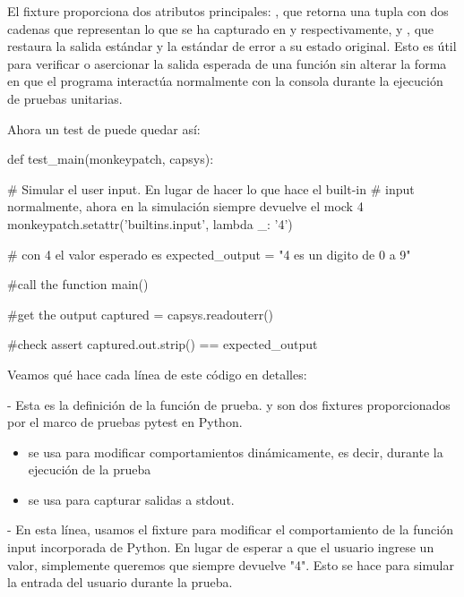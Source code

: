 El fixture  proporciona dos atributos principales: 
 , 
que retorna una tupla con dos cadenas que representan lo que se ha capturado en  y  respectivamente,
y ,
que restaura la salida estándar y la estándar de error a su estado original. Esto es útil para verificar o asercionar la salida esperada de una función sin alterar la forma en que el programa interactúa normalmente con la consola durante la ejecución de pruebas unitarias.

Ahora un test de  puede quedar así:

\begin{python}
def test_main(monkeypatch, capsys): 

    # Simular el user input. En lugar de hacer lo que hace el built-in
    # input normalmente, ahora en la simulación siempre devuelve el mock 4
    monkeypatch.setattr('builtins.input', lambda _: '4')
    
    # con 4 el valor esperado es
    expected_output = "4 es un digito de 0 a 9"
    
    #call the function
    main()
    
    #get the output
    captured = capsys.readouterr()
    
    #check
    assert captured.out.strip() == expected_output
\end{python}

Veamos qué hace cada línea de este código en detalles:

 - Esta es la definición de la función de prueba.  y  son dos fixtures proporcionados por el marco de pruebas pytest en Python. 

\begin{itemize}
\item {} se usa para modificar comportamientos dinámicamente, es decir, durante la ejecución de la prueba
\item {} se usa para capturar salidas a stdout.    
\end{itemize}

 - En esta línea, usamos el fixture  para modificar el comportamiento de la función input incorporada de Python. En lugar de esperar a que el usuario ingrese un valor, simplemente queremos que siempre devuelve "4". Esto se hace para simular la entrada del usuario durante la prueba. 

